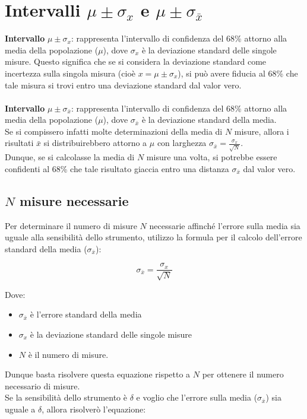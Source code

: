\documentclass{article}
\begin{document}
\section{Intervalli $\mu \pm \sigma_x$ e $\mu \pm \sigma_{\bar{x}}$} 
\textbf{Intervallo} $\mu \pm \sigma_x$: rappresenta l'intervallo di confidenza del 68\% attorno alla media della popolazione ($\mu$), dove $\sigma_x$ è la deviazione standard delle singole misure. Questo significa che se si considera la deviazione standard come incertezza sulla singola misura (cioè $x = \mu \pm \sigma_x$), si può avere fiducia al 68\% che tale misura si trovi entro una deviazione standard dal valor vero.
\\\\ \noindent\textbf{Intervallo} $\mu \pm \sigma_{\bar{x}}$: rappresenta l'intervallo di confidenza del 68\% attorno alla media della popolazione ($\mu$), dove $\sigma_{\bar{x}}$ è la deviazione standard della media.
\\Se si compissero infatti molte determinazioni della media di $N$ misure, allora i risultati $\bar{x}$ si distribuirebbero attorno a $\mu$ con larghezza $\sigma_{\bar{x}} =  \frac{\sigma_x}{\sqrt{N}} $.
\\ Dunque, se si calcolasse la media di $N$ misure una volta, si potrebbe essere confidenti al 68\% che tale risultato giaccia entro una distanza $ \sigma_{\bar{x}}$ dal valor vero.

\subsection{$N$ misure necessarie}
Per determinare il numero di misure $N$ necessarie affinché l'errore sulla media sia uguale alla sensibilità dello strumento, utilizzo la formula per il calcolo dell'errore standard della media ($\sigma_{\bar{x}}$):

\[\sigma_{\bar{x}} = \frac{\sigma_x}{\sqrt{N}}\]

\noindent Dove:
\begin{itemize}
  \item $\sigma_{\bar{x}}$ è l'errore standard della media
  \item $\sigma_x$ è la deviazione standard delle singole misure
  \item $N$ è il numero di misure.
\end{itemize}

\noindent Dunque basta risolvere questa equazione rispetto a $N$ per ottenere il numero necessario di misure. \\Se la sensibilità dello strumento è $\delta$ e voglio che l'errore sulla media ($\sigma_{\bar{x}}$) sia uguale a $\delta$, allora risolverò l'equazione:
\end{document}
